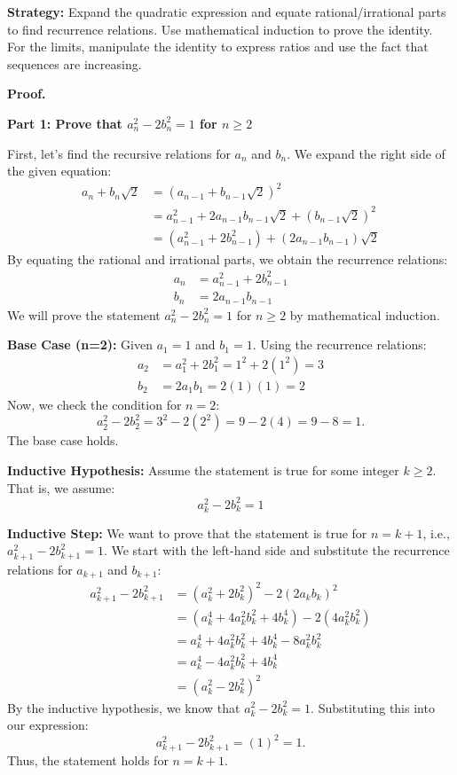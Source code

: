 \noindent\textbf{Strategy:} Expand the quadratic expression and equate rational/irrational parts to find recurrence relations. Use mathematical induction to prove the identity. For the limits, manipulate the identity to express ratios and use the fact that sequences are increasing.

\noindent\textbf{Proof.}

\textbf{Part 1: Prove that $a_n^2 - 2b_n^2 = 1$ for $n \geq 2$}

First, let's find the recursive relations for $a_n$ and $b_n$. We expand the right side of the given equation:
\begin{align*}
a_n + b_n \sqrt{2} &= (a_{n-1} + b_{n-1} \sqrt{2})^2 \\
&= a_{n-1}^2 + 2a_{n-1}b_{n-1}\sqrt{2} + (b_{n-1}\sqrt{2})^2 \\
&= (a_{n-1}^2 + 2b_{n-1}^2) + (2a_{n-1}b_{n-1})\sqrt{2}
\end{align*}
By equating the rational and irrational parts, we obtain the recurrence relations:
\begin{align}
a_n &= a_{n-1}^2 + 2b_{n-1}^2 \label{eq:an} \\
b_n &= 2a_{n-1}b_{n-1} \label{eq:bn}
\end{align}
We will prove the statement $a_n^2 - 2b_n^2 = 1$ for $n \geq 2$ by mathematical induction.

\textbf{Base Case (n=2):}
Given $a_1 = 1$ and $b_1 = 1$. Using the recurrence relations:
\begin{align*}
a_2 &= a_1^2 + 2b_1^2 = 1^2 + 2(1^2) = 3 \\
b_2 &= 2a_1b_1 = 2(1)(1) = 2
\end{align*}
Now, we check the condition for $n=2$:
\[ a_2^2 - 2b_2^2 = 3^2 - 2(2^2) = 9 - 2(4) = 9 - 8 = 1. \]
The base case holds.

\textbf{Inductive Hypothesis:}
Assume the statement is true for some integer $k \geq 2$. That is, we assume:
\[ a_k^2 - 2b_k^2 = 1 \]

\textbf{Inductive Step:}
We want to prove that the statement is true for $n=k+1$, i.e., $a_{k+1}^2 - 2b_{k+1}^2 = 1$.
We start with the left-hand side and substitute the recurrence relations for $a_{k+1}$ and $b_{k+1}$:
\begin{align*}
a_{k+1}^2 - 2b_{k+1}^2 &= (a_k^2 + 2b_k^2)^2 - 2(2a_k b_k)^2 \\
&= (a_k^4 + 4a_k^2 b_k^2 + 4b_k^4) - 2(4a_k^2 b_k^2) \\
&= a_k^4 + 4a_k^2 b_k^2 + 4b_k^4 - 8a_k^2 b_k^2 \\
&= a_k^4 - 4a_k^2 b_k^2 + 4b_k^4 \\
&= (a_k^2 - 2b_k^2)^2
\end{align*}
By the inductive hypothesis, we know that $a_k^2 - 2b_k^2 = 1$. Substituting this into our expression:
\[ a_{k+1}^2 - 2b_{k+1}^2 = (1)^2 = 1. \]
Thus, the statement holds for $n=k+1$.

